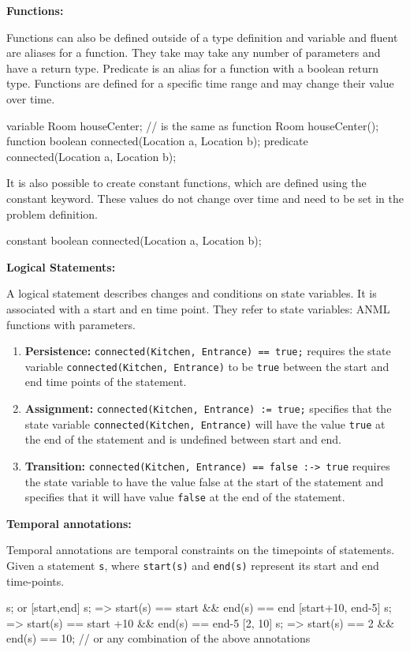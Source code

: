 {\bf Functions:}

Functions can also be defined outside of a type definition and variable and fluent are aliases for a function.
They take may take any number of parameters and have a return type.
Predicate is an alias for a function with a boolean return type.
Functions are defined for a specific time range and may change their value over time.

\begin{anmlcode}
variable Room houseCenter; // is the same as
function Room houseCenter();
function boolean connected(Location a, Location b);
predicate connected(Location a, Location b);
\end{anmlcode}

It is also possible to create constant functions, which are defined using the constant keyword.
These values do not change over time and need to be set in the problem definition.

\begin{anmlcode}
constant boolean connected(Location a, Location b);
\end{anmlcode}



{\bf Logical Statements:}

A logical statement describes changes and conditions on state variables. It is
associated with a start and en time point.
They refer to state variables: ANML functions with parameters.
\begin{enumerate}
  \item {\bf Persistence:} \lstinline!connected(Kitchen, Entrance) == true;! requires the state
  variable \lstinline!connected(Kitchen, Entrance)! to be \lstinline!true! between the start and
  end time points of the statement.
  \item {\bf Assignment:} \lstinline!connected(Kitchen, Entrance) := true;! specifies that the
  state variable \lstinline!connected(Kitchen, Entrance)! will have the value \lstinline!true! at
  the end of the statement and is undefined between start and end.
  \item {\bf Transition:} \lstinline!connected(Kitchen, Entrance) == false :-> true! requires the
  state variable to have the value false at the start of the statement and
  specifies that it will have value \lstinline!false! at the end of the statement.
\end{enumerate}

{\bf Temporal annotations:}

Temporal annotations are temporal constraints on the timepoints of
statements. Given a statement \lstinline!s!, where \lstinline!start(s)! and \lstinline!end(s)! represent its
start and end time-points.
\begin{anmlcode}
[all] s; or [start,end] s;
=> start(s) == start && end(s) == end
[start+10, end-5] s;
=> start(s) == start +10 && end(s) == end-5
[2, 10] s;
=> start(s) == 2 && end(s) == 10;
// or any combination of the above annotations
\end{anmlcode}
  
